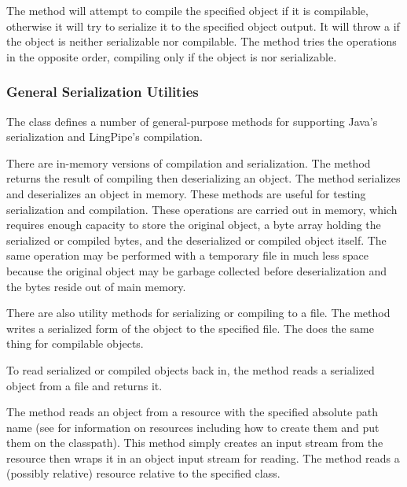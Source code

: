 The method  will attempt
to compile the specified object if it is compilable, otherwise it
will try to serialize it to the specified object output.  It will throw
a  if the object is neither serializable
nor compilable.  The method 
tries the operations in the opposite order, compiling only if the
object is nor serializable.

\subsubsection{General Serialization Utilities}

The  class defines a number of
general-purpose methods for supporting Java's serialization and 
LingPipe's compilation.

There are in-memory versions of compilation and serialization.  The
method  returns the result of compiling then
deserializing an object. The method
 serializes and deserializes
an object in memory.  These methods are useful for testing
serialization and compilation.  These operations are carried out in
memory, which requires enough capacity to store the original object, a
byte array holding the serialized or compiled bytes, and the
deserialized or compiled object itself.  The same operation may be
performed with a temporary file in much less space because the
original object may be garbage collected before deserialization and
the bytes reside out of main memory.

There are also utility methods for serializing or compiling to a file.
The method  writes
a serialized form of the object to the specified file.  The 
 does the same thing for compilable
objects.

To read serialized or compiled objects back in, the method
 reads a serialized object from a file and
returns it.

The method  reads an object from a
resource with the specified absolute path name (see
 for information on resources including
how to create them and put them on the classpath).  This method simply
creates an input stream from the resource then wraps it in an object
input stream for reading.  The
 method reads a (possibly
relative) resource relative to the specified class.  


